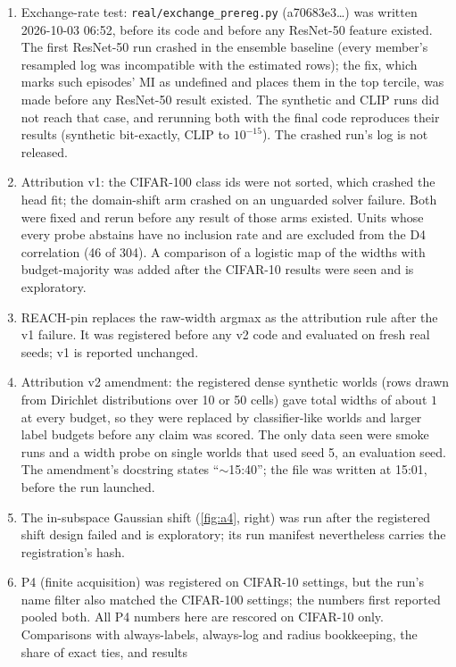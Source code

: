 \begin{enumerate}
disagrees with its file time (23:12); the order relative to the runs is unaffected.
\item Exchange-rate test: \texttt{real/exchange\_prereg.py} (a70683e3\ldots) was written 2026-10-03 06:52,
before its code and before any ResNet-50 feature existed. The first ResNet-50 run crashed in the ensemble
baseline (every member's resampled log was incompatible with the estimated rows); the fix, which marks
such episodes' MI as undefined and places them in the top tercile, was made before any ResNet-50 result
existed. The synthetic and CLIP runs did not reach that case, and rerunning both with the final code
reproduces their results (synthetic bit-exactly, CLIP to $10^{-15}$). The crashed run's log is not
released.
\item Attribution v1: the CIFAR-100 class ids were not sorted, which crashed the head fit; the
domain-shift arm crashed on an unguarded solver failure. Both were fixed and rerun before any result of
those arms existed. Units whose every probe abstains have no inclusion rate and are excluded from the D4
correlation (46 of 304). A comparison of a logistic map of the widths with budget-majority was added after
the CIFAR-10 results were seen and is exploratory.
\item REACH-pin replaces the raw-width argmax as the attribution rule after the v1 failure. It was
registered before any v2 code and evaluated on fresh real seeds; v1 is reported unchanged.
\item Attribution v2 amendment: the registered dense synthetic worlds (rows drawn from Dirichlet
distributions over 10 or 50 cells) gave total widths of about $1$ at every budget, so they were replaced by
classifier-like worlds and larger label budgets before any claim was scored. The only data seen were
smoke runs and a width probe on single worlds that used seed 5, an evaluation seed. The amendment's
docstring states ``$\sim$15:40''; the file was written at 15:01, before the run launched.
\item The in-subspace Gaussian shift (\cref{fig:a4}, right) was run after the registered shift design
failed and is exploratory; its run manifest nevertheless carries the registration's hash.
\item P4 (finite acquisition) was registered on CIFAR-10 settings, but the run's name filter also matched
the CIFAR-100 settings; the numbers first reported pooled both. All P4 numbers here are rescored on CIFAR-10
only. Comparisons with always-labels, always-log and radius bookkeeping, the share of exact ties, and results

\end{enumerate}
